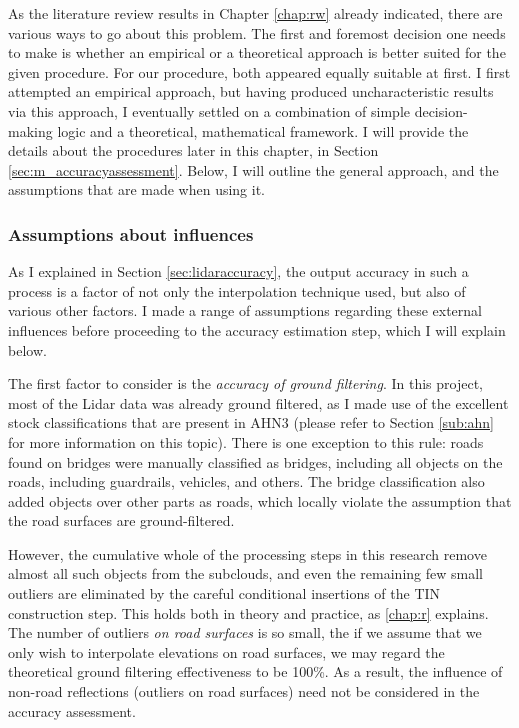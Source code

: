 As the literature review results in Chapter \ref{chap:rw} already indicated, there are various ways to go about this problem. The first and foremost decision one needs to make is whether an empirical or a theoretical approach is better suited for the given procedure. For our procedure, both appeared equally suitable at first. I first attempted an empirical approach, but having produced uncharacteristic results via this approach, I eventually settled on a combination of simple decision-making logic and a theoretical, mathematical framework. I will provide the details about the procedures later in this chapter, in Section \ref{sec:m_accuracyassessment}. Below, I will outline the general approach, and the assumptions that are made when using it.

\subsubsection{Assumptions about influences}

As I explained in Section \ref{sec:lidaraccuracy}, the output accuracy in such a process is a factor of not only the interpolation technique used, but also of various other factors. I made a range of assumptions regarding these external influences before proceeding to the accuracy estimation step, which I will explain below.

The first factor to consider is the \textit{accuracy of ground filtering}. In this project, most of the Lidar data was already ground filtered, as I made use of the excellent stock classifications that are present in AHN3 (please refer to Section \ref{sub:ahn} for more information on this topic). There is one exception to this rule: roads found on bridges were manually classified as bridges, including all objects on the roads, including guardrails, vehicles, and others. The bridge classification also added objects over other parts as roads, which locally violate the assumption that the road surfaces are ground-filtered.

However, the cumulative whole of the processing steps in this research remove almost all such objects from the subclouds, and even the remaining few small outliers are eliminated by the careful conditional insertions of the TIN construction step. This holds both in theory and practice, as \ref{chap:r} explains. The number of outliers \textit{on road surfaces} is so small, the if we assume that we only wish to interpolate elevations on road surfaces, we may regard the theoretical ground filtering effectiveness to be 100\%. As a result, the influence of non-road reflections (outliers on road surfaces) need not be considered in the accuracy assessment.

